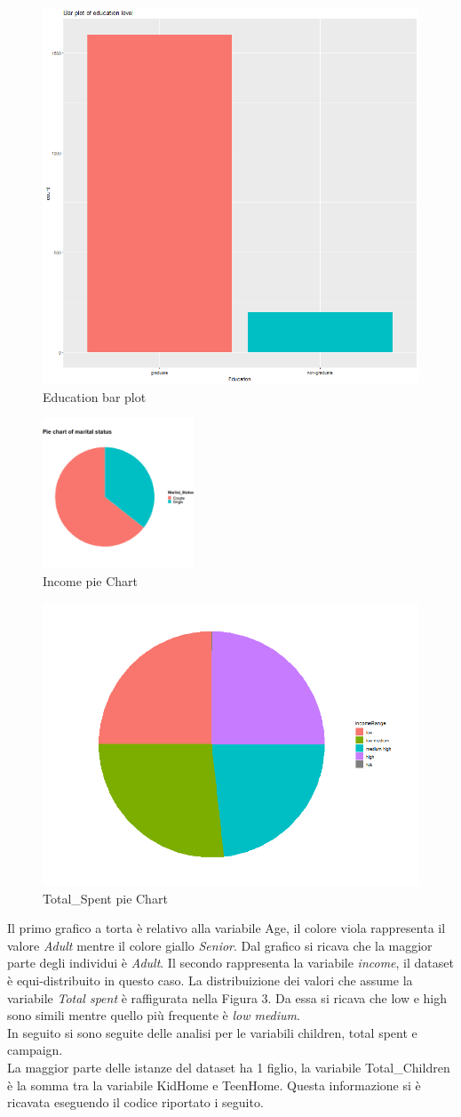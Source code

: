 \documentclass[letterpaper,11pt]{article}
\begin{document}
\begin{figure}[h!]
    \centering
    \includegraphics[width=.4\textwidth]{Img/EDA/EDA003.png}
    \caption{Education bar plot}
\end{figure}
\begin{figure}[h!]
    \centering
    \includegraphics[width=0.4\textwidth]{Img/EDA/EDA004.png}
    \caption{Income pie Chart }
\end{figure}

\begin{figure}[h!]
    \centering
    \includegraphics[width=.4\textwidth]{Img/EDA/EDA005.png}
    \caption{Total\_Spent pie Chart}
\end{figure}

Il primo grafico a torta è relativo alla variabile Age, il colore viola rappresenta il valore \textit{Adult} mentre il colore giallo \textit{Senior}. Dal grafico si ricava che la maggior parte degli individui è \textit{Adult}.
Il secondo rappresenta la variabile \textit{income}, il dataset è equi-distribuito in questo caso.
La distribuizione dei valori che assume la variabile \textit{Total spent} è raffigurata nella Figura 3. Da essa si ricava che low e high sono simili mentre quello più frequente è \textit{low medium}.\\
In seguito si sono seguite delle analisi per le variabili children, total spent e campaign.\\
La maggior parte delle istanze del dataset ha 1 figlio, la variabile Total\_Children è la somma tra la variabile KidHome e TeenHome. Questa informazione si è ricavata eseguendo il codice riportato i seguito.\\
\end{document}
